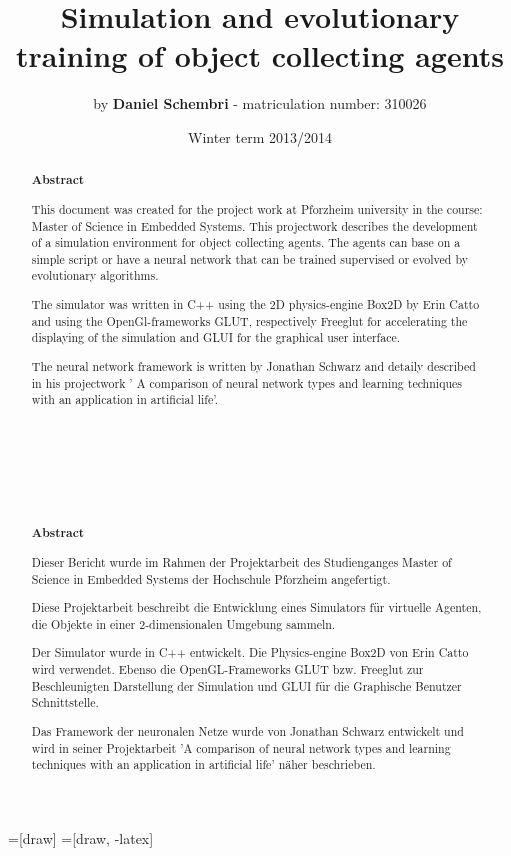 \documentclass[10pt,a4paper,DIV=11]{scrreprt}
\title
{
    Simulation and evolutionary training of object collecting agents\\
}
\author
{
    by \textbf{Daniel Schembri} - matriculation number: 310026
}
\date
{
    Winter term 2013/2014
}
\begin{document}
=[draw]
=[draw, -latex] 


\maketitle
\thispagestyle{empty}
\newpage
{\large\tableofcontents}
\newpage

% 
%
%
%
%
\begin{abstract} 
\huge{\textbf{Abstract}} \\

\normalsize

This document was created for the project work at Pforzheim university in the course: Master of Science in Embedded Systems. 
This projectwork describes the development of a simulation environment for object collecting agents. The agents can base on a simple script or have a neural network that can be trained supervised or evolved by evolutionary algorithms.

The simulator was written in C++ using the 2D physics-engine Box2D by Erin Catto and using the OpenGl-frameworks GLUT, respectively Freeglut for accelerating the displaying of the simulation and GLUI for the graphical user interface. 

The neural network framework is written by Jonathan Schwarz and detaily described in his projectwork ' A comparison of neural network types and learning techniques with an application in artificial life'. \\ \\ \\ \\ \\ \\ \\ \\

\huge{\textbf{Abstract}} \\

\normalsize

Dieser Bericht wurde im Rahmen der Projektarbeit des Studienganges Master of Science in Embedded Systems der Hochschule Pforzheim angefertigt. 

Diese Projektarbeit beschreibt die Entwicklung eines Simulators für virtuelle Agenten, die Objekte in einer 2-dimensionalen Umgebung sammeln. 

Der Simulator wurde in C++ entwickelt. Die Physics-engine Box2D von Erin Catto wird verwendet. Ebenso die OpenGL-Frameworks GLUT bzw. Freeglut zur Beschleunigten Darstellung der Simulation und GLUI für die Graphische Benutzer Schnittstelle. 

Das Framework der neuronalen Netze wurde von Jonathan Schwarz entwickelt und wird in seiner Projektarbeit 'A comparison of neural network types and learning techniques with an application in artificial life' näher beschrieben.
	
	
\end{abstract}
\end{document}
